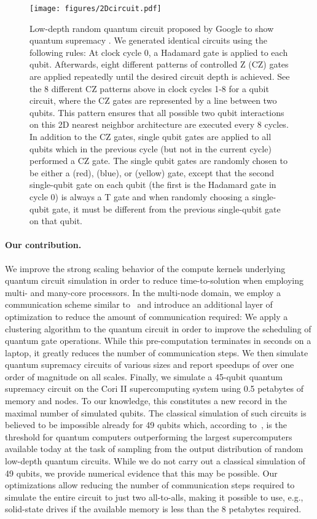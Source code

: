 \documentclass[sigconf]{acmart}
\begin{document}
\begin{figure*}[ht]
	\texttt{[image: figures/2Dcircuit.pdf]}
	\caption{Low-depth random quantum circuit proposed by Google to show quantum supremacy \cite{boixo2016characterizing}. We generated identical circuits using the following rules: At clock cycle 0, a Hadamard gate is applied to each qubit. Afterwards, eight different patterns of controlled Z (CZ) gates are applied repeatedly until the desired circuit depth is achieved. See the 8 different CZ patterns above in clock cycles 1-8 for a  qubit circuit, where the CZ gates are represented by a line between two qubits. This pattern ensures that all possible two qubit interactions on this 2D nearest neighbor architecture are executed every 8 cycles.
		In addition to the CZ gates, single qubit gates are applied to all qubits which in the previous cycle (but not in the current cycle) performed a CZ gate. The single qubit gates are randomly chosen to be either a  (red),  (blue), or  (yellow) gate, except that the second single-qubit gate on each qubit (the first is the Hadamard gate in cycle 0) is always a T gate and when randomly choosing a single-qubit gate, it must be different from the previous single-qubit gate on that qubit.}
	\label{fig:supremacy_circuit}
\end{figure*}

\paragraph{Our contribution.} We improve the strong scaling behavior of the compute kernels underlying quantum circuit simulation in order to reduce time-to-solution when employing multi- and many-core processors. In the multi-node domain, we employ a communication scheme similar to~\cite{de2007massively} and introduce an additional layer of optimization to reduce the amount of communication required: We apply a clustering algorithm to the quantum circuit in order to improve the scheduling of quantum gate operations. While this pre-computation terminates in  seconds on a laptop, it greatly reduces the number of communication steps. We then simulate quantum supremacy circuits of various sizes and report speedups of over one order of magnitude on all scales. Finally, we simulate a 45-qubit quantum supremacy circuit on the Cori II supercomputing system using 0.5 petabytes of memory and  nodes. To our knowledge, this constitutes a new record in the maximal number of simulated qubits.
The classical simulation of such circuits is believed to be impossible already for 49 qubits which, according to~\cite{Mohseni2017}, is the threshold for quantum computers outperforming the largest supercomputers available today at the task of sampling from the output distribution of random low-depth quantum circuits. While we do not carry out a classical simulation of 49 qubits, we provide numerical evidence that this may be possible. Our optimizations allow reducing the number of communication steps required to simulate the entire circuit to just two all-to-alls, making it possible to use, e.g., solid-state drives if the available memory is less than the 8 petabytes required.
\end{document}
